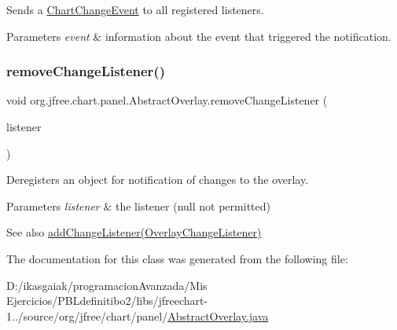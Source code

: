 Sends a \mbox{\hyperlink{}{Chart\+Change\+Event}} to all registered listeners.


\begin{DoxyParams}{Parameters}
{\em event} & information about the event that triggered the notification. \\
\hline
\end{DoxyParams}
\mbox{\label{classorg_1_1jfree_1_1chart_1_1panel_1_1_abstract_overlay_a0b069ed367855570b9ac89ff324a881a}} 
\subsubsection{\texorpdfstring{remove\+Change\+Listener()}{removeChangeListener()}}
{\footnotesize\ttfamily void org.\+jfree.\+chart.\+panel.\+Abstract\+Overlay.\+remove\+Change\+Listener (\begin{DoxyParamCaption}\item[{\mbox{\hyperlink{interfaceorg_1_1jfree_1_1chart_1_1event_1_1_overlay_change_listener}{Overlay\+Change\+Listener}}}]{listener }\end{DoxyParamCaption})}

Deregisters an object for notification of changes to the overlay.


\begin{DoxyParams}{Parameters}
{\em listener} & the listener ({\ttfamily null} not permitted)\\
\hline
\end{DoxyParams}
\begin{DoxySeeAlso}{See also}
\mbox{\hyperlink{classorg_1_1jfree_1_1chart_1_1panel_1_1_abstract_overlay_a987e3cccb62e8de2948b2228c6506b65}{add\+Change\+Listener(\+Overlay\+Change\+Listener)}} 
\end{DoxySeeAlso}


The documentation for this class was generated from the following file\+:\begin{DoxyCompactItemize}
\item 
D\+:/ikasgaiak/programacion\+Avanzada/\+Mis Ejercicios/\+P\+B\+Ldefinitibo2/libs/jfreechart-\/1../source/org/jfree/chart/panel/\mbox{\hyperlink{_abstract_overlay_8java}{Abstract\+Overlay.\+java}}\end{DoxyCompactItemize}
